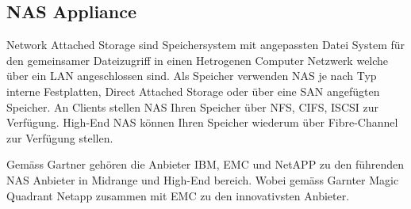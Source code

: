 \subsection{NAS Appliance}

Network Attached Storage sind Speichersystem mit angepassten Datei System für den gemeinsamer Dateizugriff in einen Hetrogenen Computer Netzwerk welche über ein LAN angeschlossen sind. Als Speicher verwenden NAS je nach Typ interne Festplatten, Direct Attached Storage oder über eine SAN angefügten Speicher.
An Clients stellen NAS Ihren Speicher über NFS, CIFS, ISCSI zur Verfügung. High-End NAS können Ihren Speicher wiederum über Fibre-Channel zur Verfügung stellen.

Gemäss Gartner gehören die Anbieter IBM, EMC und NetAPP zu den führenden NAS Anbieter in Midrange und High-End bereich. Wobei gemäss Garnter Magic Quadrant Netapp zusammen mit EMC zu den innovativsten Anbieter.

